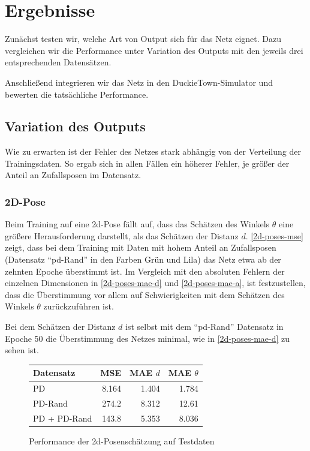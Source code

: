 \chapter{Ergebnisse}

Zunächst testen wir, welche Art von Output sich für das Netz eignet. Dazu vergleichen wir die Performance unter Variation des Outputs mit den jeweils drei entsprechenden Datensätzen. 

Anschließend integrieren wir das Netz in den DuckieTown-Simulator und bewerten die tatsächliche Performance.

\section{Variation des Outputs}

Wie zu erwarten ist der Fehler des Netzes stark abhängig von der Verteilung der Trainingsdaten. So ergab sich in allen Fällen ein höherer Fehler, je größer der Anteil an Zufallsposen im Datensatz. 

\subsection{2D-Pose}

Beim Training auf eine \acs{2d}-Pose fällt auf, dass das Schätzen des Winkels $\theta$ eine größere Herausforderung darstellt, als das Schätzen der Distanz $d$. \ref{2d-poses-mse} zeigt, dass bei dem Training mit Daten mit hohem Anteil an Zufallsposen (Datensatz ``\acs{pd}-Rand'' in den Farben Grün und Lila) das Netz etwa ab der zehnten Epoche überstimmt ist. Im Vergleich mit den absoluten Fehlern der einzelnen Dimensionen in \ref{2d-poses-mae-d} und \ref{2d-poses-mae-a}, ist festzustellen, dass die Überstimmung vor allem auf Schwierigkeiten mit dem Schätzen des Winkels $\theta$ zurückzuführen ist.

Bei dem Schätzen der Distanz $d$ ist selbst mit dem ``\acs{pd}-Rand'' Datensatz in Epoche 50 die Überstimmung des Netzes minimal, wie in \ref{2d-poses-mae-d} zu sehen ist.


\begin{figure}[H]
	\centering
		\begin{tabular}[t]{|l|r|r|r|}
			\hline
			Datensatz & MSE & MAE $d$ & MAE $\theta$ \\
			\hline
			PD & 8.164 & 1.404 & 1.784 \\
			\hline
			PD-Rand & 274.2 & 8.312 & 12.61 \\
			\hline
			PD + PD-Rand & 143.8 & 5.353 & 8.036 \\
			\hline
		\end{tabular}
	\caption{Performance der \acs{2d}-Posenschätzung auf Testdaten}
	\label{2d-pose-performance}
\end{figure}

